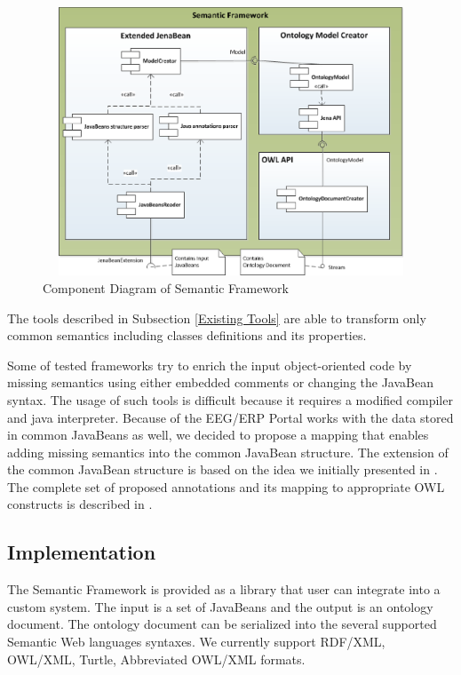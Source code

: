 \documentclass[conference]{IEEEtran}
\begin{document}
  \begin{figure}[t!]
	\centering
\includegraphics[width=12cm, height=8cm]{SemanticFramework_Component_Model}

\caption{\label{fig:Component Diagram of Semantic Framework}Component Diagram of Semantic Framework}

\end{figure}

The tools described in Subsection \ref{Existing Tools} are able to transform only common semantics including classes definitions and its properties.

Some of tested frameworks try to enrich the input object-oriented code by missing semantics using either embedded comments or changing the JavaBean syntax. The usage of such tools is difficult  because it requires a modified compiler and java interpreter. Because of the EEG/ERP Portal works with the data stored in common JavaBeans as well, we decided to propose a mapping that enables adding missing semantics into the common JavaBean structure. The extension of the common JavaBean structure is based on the idea we initially presented in \cite{Transformation-of-object-oriented-code-into-semantic-web-using-Java-annotations}. The complete set of proposed annotations and its mapping to appropriate OWL constructs is described in \cite{Semantic-Web-in-EEG-ERP-Portal}.


\subsection{Implementation}

The Semantic Framework is provided as a library that user can integrate into a custom system. The input is a set of JavaBeans and the output is an ontology document. The ontology document can be serialized into the several supported Semantic Web languages syntaxes. We currently support RDF/XML, OWL/XML, Turtle, Abbreviated OWL/XML formats.
\end{document}
